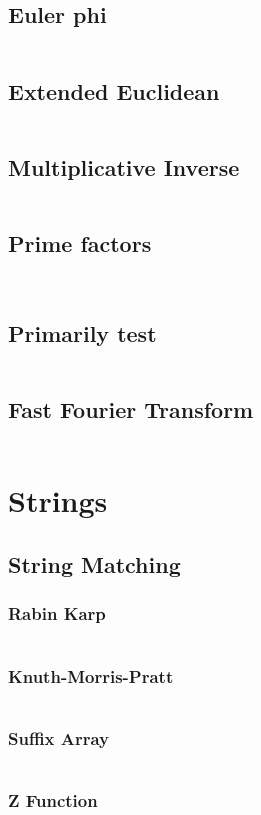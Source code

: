 \documentclass[a4paper, 10pt, twocolumn, landscape]{article}
\begin{document}
  \subsection{Euler phi}
  \inputminted{cpp}{math/euler-phi.cpp}
  \subsection{Extended Euclidean}
  \inputminted{cpp}{math/extended-euclid.cpp}
  \subsection{Multiplicative Inverse}
  \inputminted{cpp}{math/mult-inverse.cpp}
  \subsection{Prime factors}
  \inputminted{cpp}{math/prime-factors.cpp}
  \inputminted{cpp}{math/pollard-rho.cpp}
  \subsection{Primarily test}
  \inputminted{cpp}{math/miller-rabin.cpp}
  \subsection{Fast Fourier Transform}
  \inputminted{cpp}{math/fft.cpp}

  
  \section{Strings}
  \subsection{String Matching}
  \subsubsection{Rabin Karp}
  \inputminted{cpp}{strings/rabin-karp.cpp}
  \subsubsection{Knuth-Morris-Pratt}
  \inputminted{cpp}{strings/kmp.cpp}
  \subsubsection{Suffix Array}
  \inputminted{cpp}{strings/suffix-array.cpp}
  \subsubsection{Z Function}
  \inputminted{cpp}{strings/z.cpp}
\end{document}
